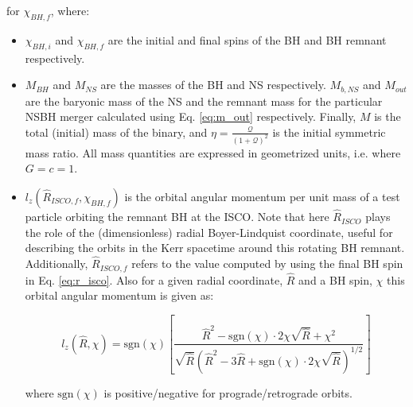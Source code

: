     for $\chi_{BH, f}$, where:

    \begin{itemize}

        \item $\chi_{BH, i}$ and $\chi_{BH, f}$ are the initial and final spins of the
            BH and BH remnant respectively.

        \item $M_{BH}$ and $M_{NS}$ are the masses of the BH and NS respectively. $M_{b,
            NS}$ and $M_{out}$ are the baryonic mass of the NS and the remnant mass for
            the particular NSBH merger calculated using Eq. \ref{eq:m_out} respectively.
            Finally, $M$ is the total (initial) mass of the binary, and $\eta =
            \frac{\mathcal{Q}}{(1 + \mathcal{Q})^2}$ is the initial symmetric mass
            ratio. All mass quantities are expressed in geometrized units, i.e. where $G
            = c = 1$.

        \item $l_z(\hat{R}_{ISCO, f}, \chi_{BH, f})$ is the orbital angular momentum per
            unit mass of a test particle orbiting the remnant BH at the ISCO. Note that
            here $\hat{R}_{ISCO}$ plays the role of the (dimensionless) radial
            Boyer-Lindquist coordinate, useful for describing the orbits in the Kerr
            spacetime around this rotating BH remnant. Additionally, $\hat{R}_{ISCO, f}$
            refers to the value computed by using the final BH spin in Eq.
            \ref{eq:r_isco}. Also for a given radial coordinate, $\hat{R}$ and a BH
            spin, $\chi$ this orbital angular momentum is given as:

            \begin{equation}
                l_z(\hat{R}, \chi) = \mathrm{sgn}(\chi)
                    \left[
                        \dfrac
                        {
                            \hat{R}^2 - \mathrm{sgn}(\chi) \cdot 2 \chi \sqrt{\hat{R}} +
                            \chi^2
                        }
                        {
                            \sqrt{\hat{R}}
                            (
                                \hat{R}^2 - 3\hat{R} + \mathrm{sgn}(\chi) \cdot 2 \chi
                                \sqrt{\hat{R}}
                            )^{1/2}
                        }
                    \right]
                \label{eq:AM_boyerlindquist}
            \end{equation}

            where $\mathrm{sgn}(\chi)$ is positive/negative for prograde/retrograde
            orbits.


\end{itemize}
